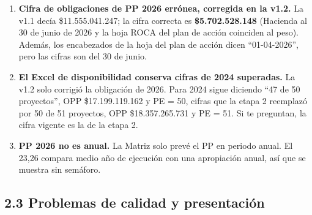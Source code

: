 \documentclass[11pt,letterpaper]{article}
\begin{document}
\begin{enumerate}
\item \textbf{Cifra de obligaciones de PP 2026 errónea, corregida en la v1.2.} La v1.1 decía \$11.555.041.247; la cifra correcta es \textbf{\$5.702.528.148} (Hacienda al 30 de junio de 2026 y la hoja ROCA del plan de acción coinciden al peso). Además, los encabezados de la hoja del plan de acción dicen ``01-04-2026'', pero las cifras son del 30 de junio.
\item \textbf{El Excel de disponibilidad conserva cifras de 2024 superadas.} La v1.2 solo corrigió la obligación de 2026. Para 2024 sigue diciendo ``47 de 50 proyectos'', OPP \$17.199.119.162 y PE = 50, cifras que la etapa 2 reemplazó por 50 de 51 proyectos, OPP \$18.357.265.731 y PE = 51. Si te preguntan, la cifra vigente es la de la etapa 2.
\item \textbf{PP 2026 no es anual.} La Matriz solo prevé el PP en periodo anual. El 23,26 compara medio año de ejecución con una apropiación anual, así que se muestra sin semáforo.
\end{enumerate}

\subsection*{2.3 Problemas de calidad y presentación}

\end{document}
